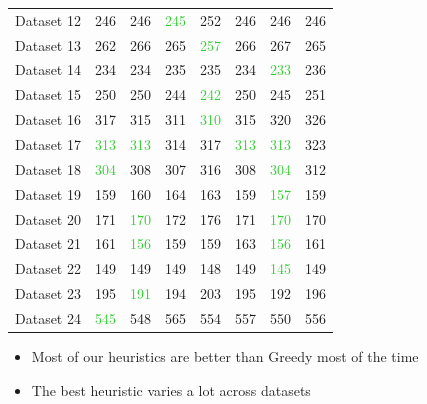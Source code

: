 \documentclass[xcolor=dvipsnames]{beamer}
\begin{document}
\begin{frame}
{\begin{tabular}{*{8}{l}}
 Dataset 12 &\textcolor{ProcessBlue}{246}  & \textcolor{ProcessBlue}{246}  & \textcolor{LimeGreen}{245} &  252  & \textcolor{ProcessBlue}{246}  & \textcolor{ProcessBlue}{246}  & 246 \\
 Dataset 13 &\textcolor{ProcessBlue}{262} &  266 &  \textcolor{ProcessBlue}{265}  & \textcolor{LimeGreen}{257}  & 266  & 267 &  265 \\
 Dataset 14 &\textcolor{ProcessBlue}{234}  & \textcolor{ProcessBlue}{234}  & \textcolor{ProcessBlue}{235} &  \textcolor{ProcessBlue}{235}  & \textcolor{ProcessBlue}{234} &  \textcolor{LimeGreen}{233}  & 236 \\
Dataset 15 & \textcolor{ProcessBlue}{250}  & \textcolor{ProcessBlue}{250}  & \textcolor{ProcessBlue}{244}  & \textcolor{LimeGreen}{242}  & \textcolor{ProcessBlue}{250} &  \textcolor{ProcessBlue}{245} &  251 \\
 Dataset 16 & \textcolor{ProcessBlue}{317}  & \textcolor{ProcessBlue}{315}  & \textcolor{ProcessBlue}{311}  & \textcolor{LimeGreen}{310}  & \textcolor{ProcessBlue}{315}  & \textcolor{ProcessBlue}{320}  & 326 \\
 Dataset 17 & \textcolor{LimeGreen}{313}  & \textcolor{LimeGreen}{313} &  \textcolor{ProcessBlue}{314}  & \textcolor{ProcessBlue}{317} &  \textcolor{LimeGreen}{313}  & \textcolor{LimeGreen}{313}  & 323 \\
 Dataset 18 & \textcolor{LimeGreen}{304}  & \textcolor{ProcessBlue}{308} &  \textcolor{ProcessBlue}{307}  & 316 &  \textcolor{ProcessBlue}{308}  & \textcolor{LimeGreen}{304} &  312\\
 Dataset 19 & \textcolor{ProcessBlue}{159} &  160 &  164  & 163  & \textcolor{ProcessBlue}{159} &  \textcolor{LimeGreen}{157}  & 159 \\
 Dataset 20 & 171  & \textcolor{LimeGreen}{170} &  172  & 176  & 171  & \textcolor{LimeGreen}{170}  & 170 \\
 Dataset 21& \textcolor{ProcessBlue}{161}  & \textcolor{LimeGreen}{156}  & \textcolor{ProcessBlue}{159}  & \textcolor{ProcessBlue}{159} &  163  & \textcolor{LimeGreen}{156}  & 161 \\
 Dataset 22& \textcolor{ProcessBlue}{149}  & \textcolor{ProcessBlue}{149} &  \textcolor{ProcessBlue}{149}  & \textcolor{ProcessBlue}{148}  & \textcolor{ProcessBlue}{149}  & \textcolor{LimeGreen}{145} &  149 \\
 Dataset 23& \textcolor{ProcessBlue}{195} &  \textcolor{LimeGreen}{191}  & \textcolor{ProcessBlue}{194} &  203 &  \textcolor{ProcessBlue}{195} &  \textcolor{ProcessBlue}{192} &  196 \\
 Dataset 24 & \textcolor{LimeGreen}{545}  &  \textcolor{ProcessBlue}{548} &  565  & \textcolor{ProcessBlue}{554} &  557  & \textcolor{ProcessBlue}{550}  & 556 \\
     \hline
  \end{tabular}} 
   \begin{itemize}
\item<2-> Most of our heuristics are better than Greedy most of the time
\item<3-> The best heuristic varies a lot across datasets
\end{itemize}
\end{frame}
\end{document}
